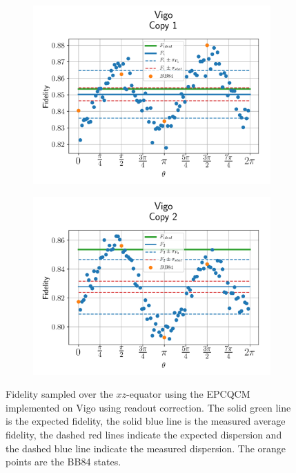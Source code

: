 \begin{figure}[H]
  \centering
  \begin{subfigure}{.5\textwidth}
    \centering
    \includegraphics[width=\textwidth]{Figures/Economical/IBM/OnlyEquator/results_corrected_vigo_copy1.png}
    \label{fig:epc_corrected_vigo_equator_1}
  \end{subfigure}%
  \begin{subfigure}{.5\textwidth}
    \centering
    \includegraphics[width=\textwidth]{Figures/Economical/IBM/OnlyEquator/results_corrected_vigo_copy2.png}
    \label{fig:epc_corrected_vigo_equator_2}
  \end{subfigure}
  \vspace{-0.5cm}
  \caption{Fidelity sampled over the $xz$-equator using the EPCQCM implemented on Vigo using readout correction. The solid green line is the expected fidelity, the solid blue line is the measured average fidelity, the dashed red lines indicate the expected dispersion and the dashed blue line indicate the measured dispersion. The orange points are the BB84 states.}
  \label{fig:epc_corrected_vigo_equator}
\end{figure}

